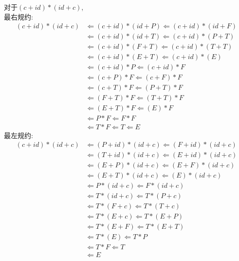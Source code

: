 \documentclass{article}
\begin{document}
对于$(c + id) * (id + c)$, \\
最右规约:
\begin{align*}
    (c + id) * (id + c) & \Leftarrow (c + id) * (id + P) \Leftarrow (c + id) * (id + F) \\
                        & \Leftarrow (c + id) * (id + T) \Leftarrow (c + id) * (P + T) \\
                        & \Leftarrow (c + id) * (F + T) \Leftarrow (c + id) * (T + T) \\
                        & \Leftarrow (c + id) * (E + T) \Leftarrow (c + id) * (E) \\
                        & \Leftarrow (c + id) * P \Leftarrow (c + id) * F \\
                        & \Leftarrow (c + P) * F \Leftarrow (c + F) * F \\
                        & \Leftarrow (c + T) * F \Leftarrow (P + T) * F \\
                        & \Leftarrow (F + T) * F \Leftarrow (T + T) * F \\
                        & \Leftarrow (E + T) * F \Leftarrow (E) * F \\
                        & \Leftarrow P * F \Leftarrow F * F \\
                        & \Leftarrow T * F \Leftarrow T \Leftarrow E
\end{align*}
最左规约:
\begin{align*}
    (c + id) * (id + c) & \Leftarrow (P + id) * (id + c) \Leftarrow (F + id) * (id + c) \\
                        & \Leftarrow (T + id) * (id + c) \Leftarrow (E + id) * (id + c) \\
                        & \Leftarrow (E + P) * (id + c) \Leftarrow (E + F) * (id + c) \\
                        & \Leftarrow (E + T) * (id + c) \Leftarrow (E) * (id + c) \\
                        & \Leftarrow P * (id + c) \Leftarrow F * (id + c) \\
                        & \Leftarrow T * (id + c) \Leftarrow T * (P + c) \\
                        & \Leftarrow T * (F + c) \Leftarrow T * (T + c) \\
                        & \Leftarrow T * (E + c) \Leftarrow T * (E + P) \\
                        & \Leftarrow T * (E + F) \Leftarrow T * (E + T) \\
                        & \Leftarrow T * (E) \Leftarrow T * P \\
                        & \Leftarrow T * F \Leftarrow T \\
                        & \Leftarrow E
\end{align*}
\end{document}
